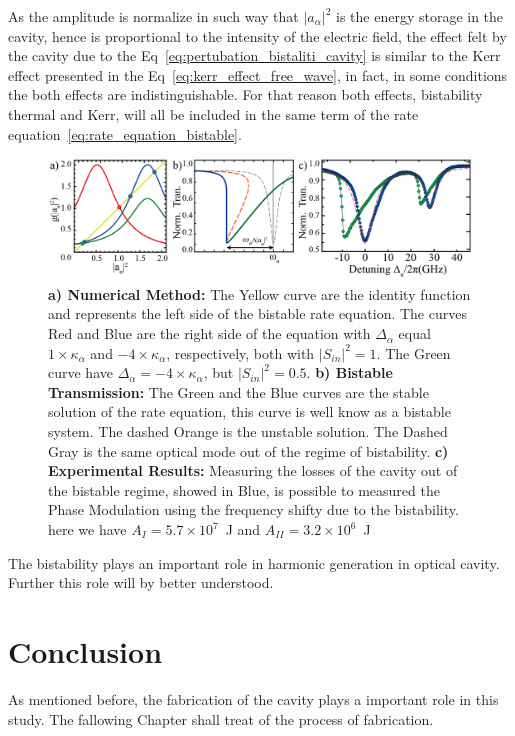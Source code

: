 As the amplitude is normalize in such way that $|a_\alpha|^2$ is the energy storage in the cavity, hence is proportional to the intensity of the electric field, the effect felt by the cavity due to the Eq~\ref{eq:pertubation_bistaliti_cavity} is similar to the Kerr effect presented in the Eq~\ref{eq:kerr_effect_free_wave}, in fact, in some conditions the both effects are indistinguishable\needcit. For that reason both effects, bistability thermal and Kerr, will all be included in the same term of the rate equation~\ref{eq:rate_equation_bistable}.
\begin{figure}[h]
    \centering
    \includegraphics[width = 16cm]{Dissertation_bistabilite.jpg}
    \caption{\textbf{a) Numerical Method:} The Yellow curve are the identity function and represents the left side of the bistable rate equation. The curves Red and Blue are the right side of the equation with $\Delta_\alpha$ equal $1\times\kappa_\alpha$ and $-4\times\kappa_\alpha$, respectively, both with $|S_{in}|^2 = 1$. The Green curve have $\Delta_\alpha = -4\times\kappa_\alpha$, but $|S_{in}|^2 = 0.5$. \textbf{b) Bistable Transmission:} The Green and the Blue curves are the stable solution of the rate equation, this curve is well know as a bistable system. The dashed Orange is the unstable solution. The Dashed Gray is the same optical mode out of the regime of bistability. \textbf{c) Experimental Results:} Measuring the losses of the cavity out of the bistable regime, showed in Blue, is possible to measured the Phase Modulation using the frequency shifty due to the bistability. here we have $A_{I} = 5.7\times10^{7}$~J and $A_{II} = 3.2\times10^{6}$~J}
    \label{fig:bistable}
\end{figure}

The bistability plays an important role in harmonic generation in optical cavity. Further this role will by better understood.  

\section{Conclusion}

As mentioned before, the fabrication of the cavity plays a important role in this study. The fallowing Chapter shall treat of the process of fabrication. 


